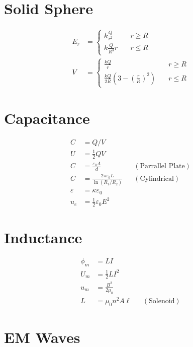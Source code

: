 \documentclass[10pt]{article}
\begin{document}
\begin{multicols*}{5}
\section{Solid Sphere}

\begin{align*}
    E_r &=
    \begin{cases}
    k \frac{Q}{r^2} & \quad r \geq R\\
    k \frac{Q}{R^3} r & \quad r \leq R
    \end{cases}\\
    V &=
    \begin{cases}
    \frac{kQ}{r} & \quad r \geq R\\
    \frac{kQ}{2R} \left({3 - \left({\frac{r}{R}}\right)^2}\right) &
    \quad r \leq R
    \end{cases}
\end{align*}

\section{Capacitance}

\begin{align*}
    C &= Q / V\\
    U &= \frac{1}{2} QV\\
    C &= \frac{\varepsilon_0 A}{d} && (\text{Parrallel Plate})\\
    C &= \frac{2\pi \varepsilon_0 L}{\ln (R_1 / R_2)} &&
    (\text{Cylindrical})\\
    \varepsilon &= \kappa \varepsilon_0\\
    u_e &= \frac{1}{2}\varepsilon_0 E^2
\end{align*}

\section{Inductance}

\begin{align*}
    \phi_m &= LI\\
    U_m &= \frac{1}{2} LI^2\\
    u_m &= \frac{B^2}{2\mu_0}\\
    L &= \mu_0 n^2 A \ell && (\text{Solenoid})
\end{align*}

\section{EM Waves}


\end{multicols*}
\end{document}
